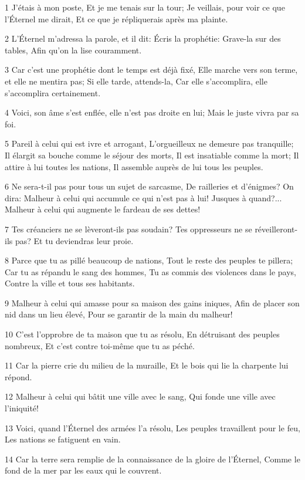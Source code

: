 \par 1 J'étais à mon poste, Et je me tenais sur la tour; Je veillais, pour voir ce que l'Éternel me dirait, Et ce que je répliquerais après ma plainte.
\par 2 L'Éternel m'adressa la parole, et il dit: Écris la prophétie: Grave-la sur des tables, Afin qu'on la lise couramment.
\par 3 Car c'est une prophétie dont le temps est déjà fixé, Elle marche vers son terme, et elle ne mentira pas; Si elle tarde, attends-la, Car elle s'accomplira, elle s'accomplira certainement.
\par 4 Voici, son âme s'est enflée, elle n'est pas droite en lui; Mais le juste vivra par sa foi.
\par 5 Pareil à celui qui est ivre et arrogant, L'orgueilleux ne demeure pas tranquille; Il élargit sa bouche comme le séjour des morts, Il est insatiable comme la mort; Il attire à lui toutes les nations, Il assemble auprès de lui tous les peuples.
\par 6 Ne sera-t-il pas pour tous un sujet de sarcasme, De railleries et d'énigmes? On dira: Malheur à celui qui accumule ce qui n'est pas à lui! Jusques à quand?... Malheur à celui qui augmente le fardeau de ses dettes!
\par 7 Tes créanciers ne se lèveront-ils pas soudain? Tes oppresseurs ne se réveilleront-ils pas? Et tu deviendras leur proie.
\par 8 Parce que tu as pillé beaucoup de nations, Tout le reste des peuples te pillera; Car tu as répandu le sang des hommes, Tu as commis des violences dans le pays, Contre la ville et tous ses habitants.
\par 9 Malheur à celui qui amasse pour sa maison des gains iniques, Afin de placer son nid dans un lieu élevé, Pour se garantir de la main du malheur!
\par 10 C'est l'opprobre de ta maison que tu as résolu, En détruisant des peuples nombreux, Et c'est contre toi-même que tu as péché.
\par 11 Car la pierre crie du milieu de la muraille, Et le bois qui lie la charpente lui répond.
\par 12 Malheur à celui qui bâtit une ville avec le sang, Qui fonde une ville avec l'iniquité!
\par 13 Voici, quand l'Éternel des armées l'a résolu, Les peuples travaillent pour le feu, Les nations se fatiguent en vain.
\par 14 Car la terre sera remplie de la connaissance de la gloire de l'Éternel, Comme le fond de la mer par les eaux qui le couvrent.
